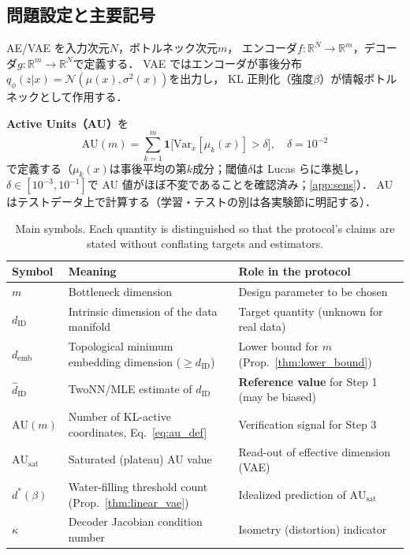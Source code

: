 \documentclass[11pt,a4paper]{jsarticle}
\newcommand{\dID}{d_{\mathrm{ID}}}
\newcommand{\hatdID}{\hat{d}_{\mathrm{ID}}}
\newcommand{\R}{\mathbb{R}}
\newcommand{\kap}{\kappa}
\newcommand{\AUsat}{\mathrm{AU}_{\mathrm{sat}}}
\newcommand{\demb}{d_{\mathrm{emb}}}
\newcommand{\dstar}{d^{*}(\beta)}
\begin{document}
\subsection{問題設定と主要記号}\label{sec:protocol_setup}

AE/VAE を入力次元$N$，ボトルネック次元$m$，
エンコーダ$f: \R^N \to \R^m$，デコーダ$g: \R^m \to \R^N$で定義する．
VAE ではエンコーダが事後分布$q_\phi(z|x) = \mathcal{N}(\mu(x), \sigma^2(x))$を出力し，
KL 正則化（強度$\beta$）が情報ボトルネックとして作用する．

\textbf{Active Units（AU）}を
\begin{equation}
  \mathrm{AU}(m) = \sum_{k=1}^{m} \mathbf{1}\bigl[\mathrm{Var}_x[\mu_k(x)] > \delta\bigr],
  \quad \delta = 10^{-2}
  \label{eq:au_def}
\end{equation}
で定義する（$\mu_k(x)$は事後平均の第$k$成分；閾値$\delta$は
Lucas ら\cite{lucas2019elbo}に準拠し，$\delta \in [10^{-3}, 10^{-1}]$で
AU 値がほぼ不変であることを確認済み；\ref{app:sens}）．
AU はテストデータ上で計算する（学習・テストの別は各実験節に明記する）．

\begin{table}[H]
\centering
\caption{Main symbols. Each quantity is distinguished so that the protocol's
claims are stated without conflating targets and estimators.}
\label{tab:notation}
\small
\begin{tabular}{lll}
\toprule
Symbol & Meaning & Role in the protocol \\
\midrule
$m$ & Bottleneck dimension & Design parameter to be chosen \\
$\dID$ & Intrinsic dimension of the data manifold & Target quantity (unknown for real data) \\
$\demb$ & Topological minimum embedding dimension ($\geq \dID$) & Lower bound for $m$ (Prop.~\ref{thm:lower_bound}) \\
$\hatdID$ & TwoNN/MLE estimate of $\dID$ & \textbf{Reference value} for Step 1 (may be biased) \\
$\mathrm{AU}(m)$ & Number of KL-active coordinates, Eq.~\eqref{eq:au_def} & Verification signal for Step 3 \\
$\AUsat$ & Saturated (plateau) AU value & Read-out of effective dimension (VAE) \\
$\dstar$ & Water-filling threshold count (Prop.~\ref{thm:linear_vae}) & Idealized prediction of $\AUsat$ \\
$\kap$ & Decoder Jacobian condition number & Isometry (distortion) indicator \\
\bottomrule
\end{tabular}
\end{table}
\end{document}
